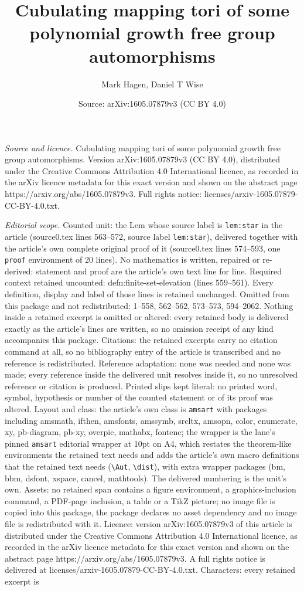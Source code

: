 \documentclass[10pt,a4paper]{amsart}
\title[Cubulating mapping tori of some polynomial growth free group]{Cubulating mapping tori of some polynomial growth free group automorphisms}
\author{Mark Hagen, Daniel T Wise}
\date{Source: arXiv:1605.07879v3 (CC BY 4.0)}
\begin{document}
\maketitle

\noindent\emph{Source and licence.} Cubulating mapping tori of some polynomial growth free group automorphisms. Version arXiv:1605.07879v3 (CC BY 4.0), distributed under the Creative Commons Attribution 4.0 International licence, as recorded in the arXiv licence metadata for this exact version and shown on the abstract page https://arxiv.org/abs/1605.07879v3. Full rights notice: licenses/arxiv-1605.07879-CC-BY-4.0.txt.\par\smallskip

\noindent\textit{Editorial scope.} Counted unit: the Lem whose source label is \texttt{lem:star} in the article (source0.tex lines 563--572, source label \texttt{lem:star}), delivered together with the article's own complete original proof of it (source0.tex lines 574--593, one \texttt{proof} environment of 20 lines). No mathematics is written, repaired or re-derived: statement and proof are the article's own text line for line. Required context retained uncounted: defn:finite-set-elevation (lines 559--561). Every definition, display and label of those lines is retained unchanged. Omitted from this package and not redistributed: 1--558, 562--562, 573--573, 594--2062. Nothing inside a retained excerpt is omitted or altered: every retained body is delivered exactly as the article's lines are written, so no omission receipt of any kind accompanies this package. Citations: the retained excerpts carry no citation command at all, so no bibliography entry of the article is transcribed and no reference is redistributed. Reference adaptation: none was needed and none was made; every reference inside the delivered unit resolves inside it, so no unresolved reference or citation is produced. Printed slips kept literal: no printed word, symbol, hypothesis or number of the counted statement or of its proof was altered. Layout and class: the article's own class is \texttt{amsart} with packages including amsmath, ifthen, amsfonts, amssymb, srcltx, amsopn, color, enumerate, xy, pb-diagram, pb-xy, overpic, mathabx, fontenc; the wrapper is the lane's pinned \texttt{amsart} editorial wrapper at 10pt on A4, which restates the theorem-like environments the retained text needs and adds the article's own macro definitions that the retained text needs (\texttt{\textbackslash Aut}, \texttt{\textbackslash dist}), with extra wrapper packages (bm, bbm, dsfont, xspace, cancel, mathtools). The delivered numbering is the unit's own. Assets: no retained span contains a figure environment, a graphics-inclusion command, a PDF-page inclusion, a table or a TikZ picture; no image file is copied into this package, the package declares no asset dependency and no image file is redistributed with it. Licence: version arXiv:1605.07879v3 of this article is distributed under the Creative Commons Attribution 4.0 International licence, as recorded in the arXiv licence metadata for this exact version and shown on the abstract page https://arxiv.org/abs/1605.07879v3. A full rights notice is delivered at licenses/arxiv-1605.07879-CC-BY-4.0.txt. Characters: every retained excerpt is 
\end{document}

